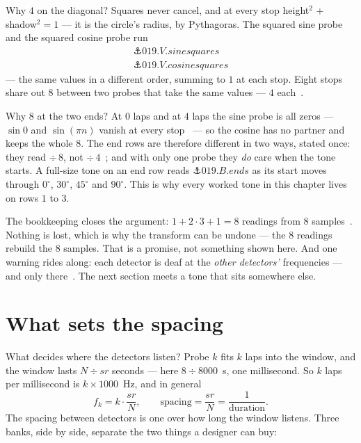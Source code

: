 \begin{narrative}
Why $4$ on the diagonal? Squares never cancel, and at every stop
height$^2$ + shadow$^2 = 1$ — it is the circle's radius, by Pythagoras.
The squared sine probe and the squared cosine probe run
\begin{gather*}
  \anchor{019.V.sinesquares} \\
  \anchor{019.V.cosinesquares}
\end{gather*}
— the same values in a different order, summing to $1$ at each stop. Eight stops share out $8$
between two probes that take the same values — $4$
each~\cite{signal_processing-j-o-smith-mdft-norm-of-the-dft-sinusoids}.

Why $8$ at the two ends? At $0$ laps and at $4$ laps the sine probe is
all zeros — $\sin 0$ and $\sin(\pi n)$ vanish at every
stop~\cite{signal_processing-smith-ch-8-dft-basis-functions} — so the
cosine has no partner and keeps the whole $8$. The end rows are
therefore different in two ways, stated once: they read $\div\, 8$, not
$\div\, 4$~\cite{signal_processing-smith-ch-8-synthesis}; and with only
one probe they \emph{do} care when the tone starts. A full-size tone on
an end row reads $\anchor{019.B.ends}$ as its start moves through
$0^\circ$, $30^\circ$, $45^\circ$ and $90^\circ$. This is why every
worked tone in this chapter lives on rows $1$ to $3$.

The bookkeeping closes the argument: $1 + 2 \cdot 3 + 1 = 8$ readings
from $8$ samples~\cite{signal_processing-smith-ch-8-notation-and-format-of-the-real-dft}.
Nothing is lost, which is why the transform can be undone — the $8$
readings rebuild the $8$ samples. That is a promise, not something shown
here. And one warning rides along: each detector is deaf at the
\emph{other detectors'} frequencies — and only
there~\cite{signal_processing-j-o-smith-mdft-frequencies-in-the-cracks,signal_processing-lyons-using-the-dft-as-a-filter-2013}.
The next section meets a tone that sits somewhere else.

\section{What sets the spacing}

What decides where the detectors listen? Probe $k$ fits $k$ laps into
the window, and the window lasts $N \div sr$ seconds — here $8 \div
8000$~s, one millisecond. So $k$ laps per millisecond is $k \times
1000$~Hz, and in general
\[
  f_k = k \cdot \frac{sr}{N}, \qquad
  \text{spacing} = \frac{sr}{N} = \frac{1}{\text{duration}} .
\]
The spacing between detectors is one over how long the window listens.
Three banks, side by side, separate the two things a designer can buy:


\end{narrative}
